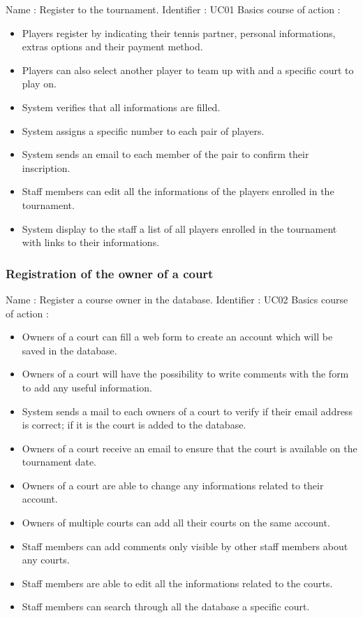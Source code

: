 Name : Register to the tournament. \newline
Identifier : UC01 \newline
Basics course of action : \newline
\begin{itemize}
	\item Players register by indicating their tennis partner, personal informations, extras 	options and their payment method.
	\item Players can also select another player to team up with and a specific court to play on.
	\item System verifies that all informations are filled.
	\item System assigns a specific number to each pair of players.
	\item System sends an email to each member of the pair to confirm their inscription.
	\item Staff members can edit all the informations of the players enrolled in the tournament.
	\item System display to the staff a list of all players enrolled in the tournament with links to their informations.
\end{itemize}

\subsubsection{Registration of the owner of a court}

Name : Register a course owner in the database. \newline
Identifier : UC02 \newline
Basics course of action : \newline
\begin{itemize}
	\item Owners of a court can fill a web form to create an account which will be saved in the database.
	\item Owners of a court will have the possibility to write comments with the form to add any useful information.
	\item System sends a mail to each owners of a court to verify if their email address is correct; if it is the court is added to the database.
	\item Owners of a court receive an email to ensure that the court is available on the tournament date.
	\item Owners of a court are able to change any informations related to their account.
	\item Owners of multiple courts can add all their courts on the same account.
	\item Staff members can add comments only visible by other staff members about any courts.
	\item Staff members are able to edit all the informations related to the courts.
	\item Staff members can search through all the database a specific court.
\end{itemize}


